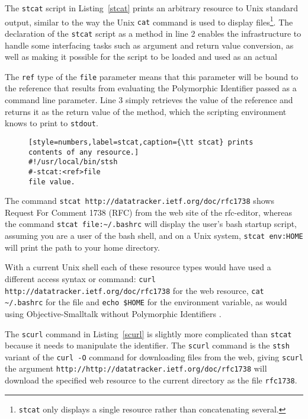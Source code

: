 \documentclass[preprint]{sigplanconf}
\begin{document}
The {\tt stcat} script in Listing~\ref{stcat} prints an arbitrary resource to Unix standard output, 
similar to the way the Unix {\tt cat} command is used to display files\footnote{{\tt stcat} only 
displays a single resource rather than concatenating several.}.
The declaration of the {\tt stcat} script as a method in line 2 enables the infrastructure to 
handle some interfacing tasks such as argument and return value conversion, as well
as making it possible for the script to be loaded and used as an actual 

The {\tt ref} type of the {\tt file} parameter means that this parameter will be bound to the
reference that results from evaluating the Polymorphic Identifier passed as a command
line parameter.    Line 3 simply retrieves the value of the reference and returns it as
the return value of the method, which the scripting environment knows to print to {\tt stdout}.


\begin{figure}[htbp]
\begin{lstlisting}[style=numbers,label=stcat,caption={\tt stcat} prints contents of any resource.]
#!/usr/local/bin/stsh
#-stcat:<ref>file
file value.
\end{lstlisting}
\end{figure}


The command  {\tt stcat http://datatracker.ietf.org/doc/rfc1738} shows \break \mbox{Request}
For Comment 1738 (RFC) from the web site of the rfc-editor, whereas 
the command {\tt stcat file:\~\//.bashrc} will display the user's bash startup script, assuming you are a user of the
bash shell, and on a Unix system, {\tt stcat env:HOME} will print the path to 
your home directory.
\fussy

With a current Unix shell each of these resource types would have used a different
access syntax or command:   {\tt curl http://datatracker.ietf.org/doc/rfc1738} for the
web resource, {\tt cat  \~\//.bashrc} for the file and {\tt echo \$HOME} for the environment
variable, as would using Objective-Smalltalk without Polymorphic Identifiers .

The {\tt scurl} command in Listing~\ref{scurl} is slightly more complicated than {\tt stcat} because
it needs to manipulate the identifier.  The {\tt scurl} command
is the {\tt stsh} variant of the {\tt curl -O} command for downloading files from the web, giving 
{\tt scurl} the argument {\tt http://http://datatracker.ietf.org/doc/rfc1738} will download the specified web resource
to the current directory as the file {\tt rfc1738}.
\end{document}
